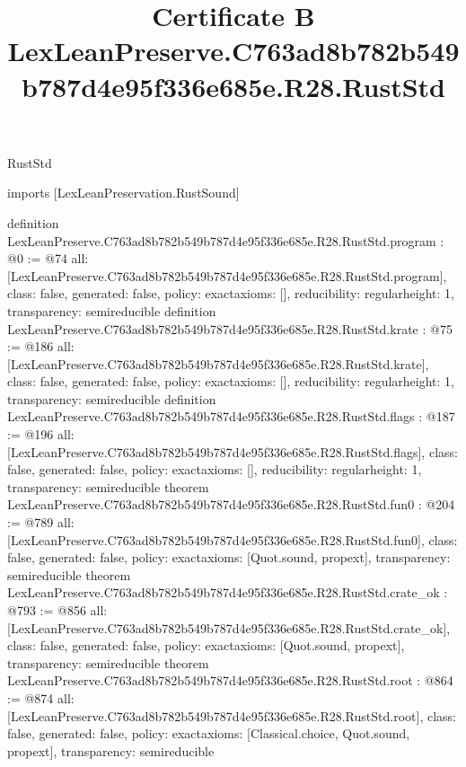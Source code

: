 \begin{lexlean}{RustStd}
\title{Certificate B LexLeanPreserve.C763ad8b782b549b787d4e95f336e685e.R28.RustStd}
\begin{coremodule}
imports [LexLeanPreservation.RustSound]

definition LexLeanPreserve.C763ad8b782b549b787d4e95f336e685e.R28.RustStd.program : @0 := @74 {
  all: [LexLeanPreserve.C763ad8b782b549b787d4e95f336e685e.R28.RustStd.program],
  class: false,
  generated: false,
  policy: exact{axioms: []},
  reducibility: regular{height: 1},
  transparency: semireducible
}
definition LexLeanPreserve.C763ad8b782b549b787d4e95f336e685e.R28.RustStd.krate : @75 := @186 {
  all: [LexLeanPreserve.C763ad8b782b549b787d4e95f336e685e.R28.RustStd.krate],
  class: false,
  generated: false,
  policy: exact{axioms: []},
  reducibility: regular{height: 1},
  transparency: semireducible
}
definition LexLeanPreserve.C763ad8b782b549b787d4e95f336e685e.R28.RustStd.flags : @187 := @196 {
  all: [LexLeanPreserve.C763ad8b782b549b787d4e95f336e685e.R28.RustStd.flags],
  class: false,
  generated: false,
  policy: exact{axioms: []},
  reducibility: regular{height: 1},
  transparency: semireducible
}
theorem LexLeanPreserve.C763ad8b782b549b787d4e95f336e685e.R28.RustStd.fun0 : @204 := @789 {
  all: [LexLeanPreserve.C763ad8b782b549b787d4e95f336e685e.R28.RustStd.fun0],
  class: false,
  generated: false,
  policy: exact{axioms: [Quot.sound, propext]},
  transparency: semireducible
}
theorem LexLeanPreserve.C763ad8b782b549b787d4e95f336e685e.R28.RustStd.crate_ok : @793 := @856 {
  all: [LexLeanPreserve.C763ad8b782b549b787d4e95f336e685e.R28.RustStd.crate_ok],
  class: false,
  generated: false,
  policy: exact{axioms: [Quot.sound, propext]},
  transparency: semireducible
}
theorem LexLeanPreserve.C763ad8b782b549b787d4e95f336e685e.R28.RustStd.root : @864 := @874 {
  all: [LexLeanPreserve.C763ad8b782b549b787d4e95f336e685e.R28.RustStd.root],
  class: false,
  generated: false,
  policy: exact{axioms: [Classical.choice, Quot.sound, propext]},
  transparency: semireducible
}


\end{coremodule}
\end{lexlean}
